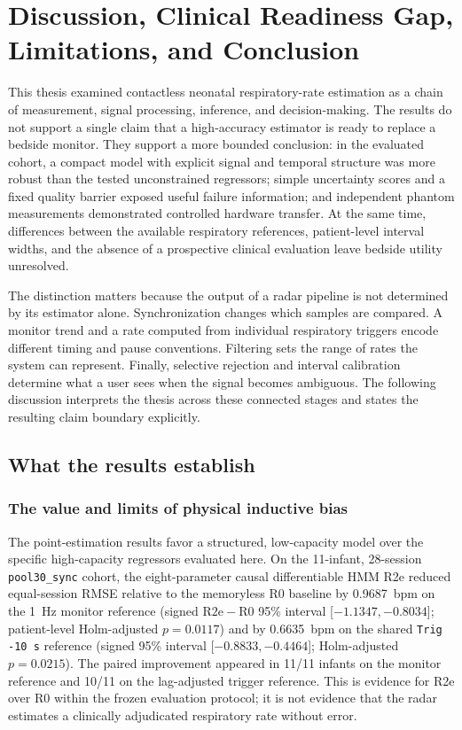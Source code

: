 \chapter{Discussion, Clinical Readiness Gap, Limitations, and Conclusion}
\label{ch:discussion_conclusion}

This thesis examined contactless neonatal respiratory-rate estimation as a chain of
measurement, signal processing, inference, and decision-making. The results do not support a
single claim that a high-accuracy estimator is ready to replace a bedside monitor. They support a
more bounded conclusion: in the evaluated cohort, a compact model with explicit signal and
temporal structure was more robust than the tested unconstrained regressors; simple uncertainty
scores and a fixed quality barrier exposed useful failure information; and independent phantom
measurements demonstrated controlled hardware transfer. At the same time, differences between
the available respiratory references, patient-level interval widths, and the absence of a
prospective clinical evaluation leave bedside utility unresolved.

The distinction matters because the output of a radar pipeline is not determined by its estimator
alone. Synchronization changes which samples are compared. A monitor trend and a rate computed
from individual respiratory triggers encode different timing and pause conventions. Filtering
sets the range of rates the system can represent. Finally, selective rejection and interval
calibration determine what a user sees when the signal becomes ambiguous. The following
discussion interprets the thesis across these connected stages and states the resulting claim
boundary explicitly.

\section{What the results establish}
\label{sec:ch7_synthesis}

\subsection{The value and limits of physical inductive bias}

The point-estimation results favor a structured, low-capacity model over the specific
high-capacity regressors evaluated here. On the 11-infant, 28-session \texttt{pool30\_sync}
cohort, the eight-parameter causal differentiable HMM R2e reduced equal-session RMSE relative to
the memoryless R0 baseline by 0.9687~bpm on the 1~Hz monitor reference (signed $\mathrm{R2e}-\mathrm{R0}$
95\% interval [$-1.1347,-0.8034$]; patient-level Holm-adjusted $p=0.0117$) and by 0.6635~bpm on
the shared \texttt{Trig -10 s} reference (signed 95\% interval [$-0.8833,-0.4464$]; Holm-adjusted
$p=0.0215$). The paired
improvement appeared in 11/11 infants on the monitor reference and 10/11 on the lag-adjusted
trigger reference. This is evidence for R2e over R0 within the frozen evaluation protocol; it is
not evidence that the radar estimates a clinically adjudicated respiratory rate without error.

